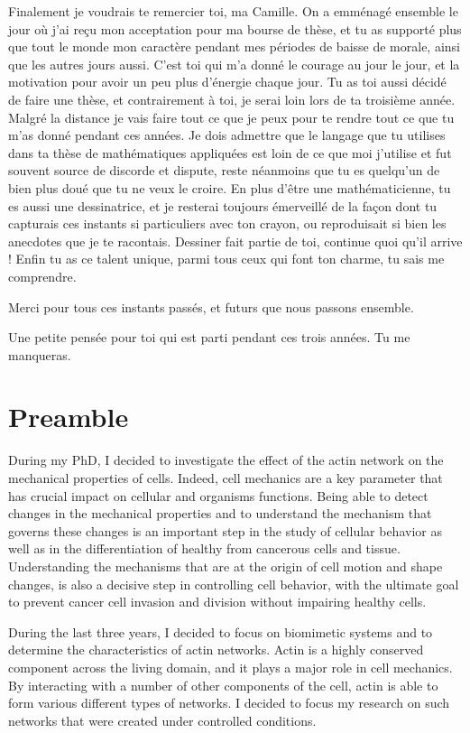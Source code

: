 \documentclass[A4paperpaper,11pt,english]{sphinxmanual}
\begin{document}
Finalement je voudrais te remercier toi, ma Camille. On a emménagé ensemble le
jour où j'ai reçu mon acceptation pour ma bourse de thèse, et tu as supporté
plus que tout le monde mon caractère pendant mes périodes de baisse de morale,
ainsi que les autres jours aussi. C'est toi qui m'a donné le courage au jour
le jour, et la motivation pour avoir un peu plus d'énergie chaque jour. Tu as
toi aussi décidé de faire une thèse, et contrairement à toi, je serai loin lors
de ta troisième année. Malgré la distance je vais faire tout ce que je peux
pour te rendre tout ce que tu m'as donné pendant ces années. Je dois admettre
que le langage que tu utilises dans ta thèse de mathématiques appliquées est loin
de ce que moi j'utilise et fut souvent source de discorde et dispute, reste
néanmoins que tu es quelqu'un de bien plus doué que tu ne veux le croire.  En
plus d'être une mathématicienne, tu es aussi une dessinatrice, et je resterai
toujours émerveillé de la façon dont tu capturais ces instants si particuliers
avec ton crayon, ou reproduisait si bien les anecdotes que je te racontais.
Dessiner fait partie de toi, continue quoi qu'il arrive !  Enfin tu as ce
talent unique, parmi tous ceux qui font ton charme, tu sais me comprendre.

Merci pour tous ces instants passés, et futurs que nous passons ensemble.

Une petite pensée pour toi qui est parti pendant ces trois années. Tu me manqueras.


\chapter{Preamble}
\label{parts/part1:preamble}\label{parts/part1::doc}
During my PhD, I decided to investigate the effect of the actin network on the
mechanical properties of cells. Indeed, cell mechanics are a key parameter that
has crucial impact on cellular and organisms functions. Being able to detect
changes in the mechanical properties and to understand the mechanism that
governs these changes is an important step in the study of cellular behavior as
well as in the differentiation of healthy from cancerous cells and tissue.
Understanding the mechanisms that are at the origin of cell motion and shape
changes, is also a decisive step in controlling cell behavior, with the ultimate
goal to prevent cancer cell invasion and division without impairing healthy
cells.

During the last three years, I decided to focus on biomimetic systems and
to determine the characteristics of actin networks. Actin is a highly conserved
component across the living domain, and it plays a major role in cell
mechanics. By interacting with a number of other components of the cell, actin
is able to form various different types of networks. I decided to focus my research on such networks that were created under
controlled conditions.
\end{document}
